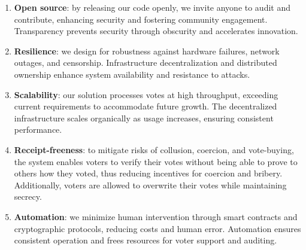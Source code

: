 \begin{enumerate}
	\item \textbf{Open source}: by releasing our code openly, we invite anyone to audit and contribute, enhancing security and fostering community engagement. Transparency prevents security through obscurity and accelerates innovation.
	
	\item \textbf{Resilience}: we design for robustness against hardware failures, network outages, and censorship. Infrastructure decentralization and distributed ownership enhance system availability and resistance to attacks.
	
	\item \textbf{Scalability}: our solution processes votes at high throughput, exceeding current requirements to accommodate future growth. The decentralized infrastructure scales organically as usage increases, ensuring consistent performance.
	
	\item \textbf{Receipt-freeness}: to mitigate risks of collusion, coercion, and vote-buying, the system enables voters to verify their votes without being able to prove to others how they voted, thus reducing incentives for coercion and bribery. Additionally, voters are allowed to overwrite their votes while maintaining secrecy.
	
	\item \textbf{Automation}: we minimize human intervention through smart contracts and cryptographic protocols, reducing costs and human error. Automation ensures consistent operation and frees resources for voter support and auditing.
\end{enumerate}


